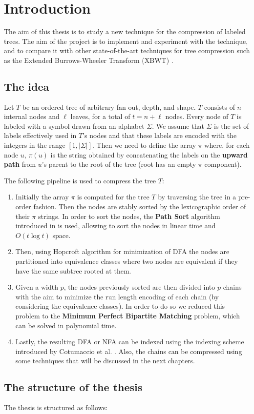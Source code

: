 \chapter{Introduction}
The aim of this thesis is to study a new technique for the compression of labeled trees. The aim of the project is to implement and experiment with the technique, and to compare it with other state-of-the-art techniques for tree compression such as the Extended Burrows-Wheeler Transform (XBWT) \cite{ferragina2009compressing}. 

\section{The idea}
Let $ T $ be an ordered tree of arbitrary fan-out, depth, and shape. $ T $ consists of $ n $ internal nodes and $ \ell $ leaves, for a total of $ t = n + \ell $ nodes. Every node of $ T $ is labeled with a symbol drawn from an alphabet $ \Sigma $. We assume that $ \Sigma $ is the set of labels effectively used in $ T $'s nodes and that these labels are encoded with the integers in the range $[1, |\Sigma|]$. Then we need to define the array $\pi$ where, for each node $u$, $\pi(u)$ is the string obtained by concatenating the labels on the \textbf{upward path} from $u$'s parent to the root of the tree (root has an empty $\pi$ component).

The following pipeline is used to compress the tree $T$:

\begin{enumerate}
    \item Initially the array $\pi$ is computed for the tree $T$ by traversing the tree in a pre-order fashion. Then the nodes are stably sorted by the lexicographic order of their $\pi$ strings. In order to sort the nodes, the \textbf{Path Sort} algorithm introduced in \cite{ferragina2009compressing} is used, allowing to sort the nodes in linear time and $O(t \log t)$ space.
    \item Then, using Hopcroft algorithm for minimization of DFA \cite{HOPCROFT1971189} the nodes are partitioned into equivalence classes where two nodes are equivalent if they have the same subtree rooted at them. 
    \item Given a width $p$, the nodes previously sorted are then divided into $p$ chains with the aim to minimize the run length encoding of each chain (by considering the equivalence classes). In order to do so we reduced this problem to the \textbf{Minimum Perfect Bipartite Matching} problem, which can be solved in polynomial time.
    \item Lastly, the resulting DFA or NFA can be indexed using the indexing scheme introduced by Cotumaccio et al. \cite{cotumaccio2023co}. Also, the chains can be compressed using some techniques that will be discussed in the next chapters.
\end{enumerate}

\section{The structure of the thesis}
The thesis is structured as follows:
